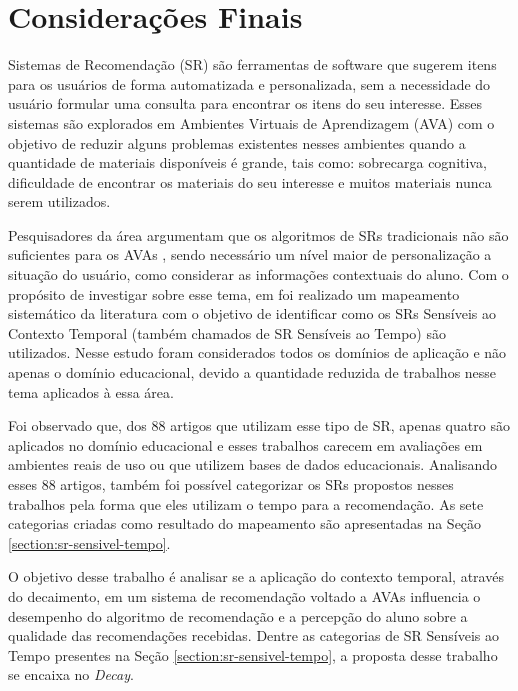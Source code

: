 \chapter{Considerações Finais}\label{chapter:conclusoes}

Sistemas de Recomendação (SR) são ferramentas de software que sugerem itens para os usuários de forma automatizada e personalizada,
sem a necessidade do usuário formular uma consulta para encontrar os itens do seu interesse. Esses sistemas são
explorados em Ambientes Virtuais de Aprendizagem (AVA) com o objetivo de reduzir alguns problemas existentes nesses ambientes
quando a quantidade de materiais disponíveis é grande, tais como: sobrecarga cognitiva, dificuldade de encontrar os materiais
do seu interesse e muitos materiais nunca serem utilizados.

Pesquisadores da área argumentam que os algoritmos de SRs tradicionais não são suficientes para os AVAs \cite{verbert2012context, drachsler2015panorama},
sendo necessário um nível maior de personalização a situação do usuário, como considerar as informações contextuais do aluno.
Com o propósito de investigar sobre esse tema, em  foi realizado um mapeamento sistemático da
literatura com o objetivo de identificar como os SRs Sensíveis ao Contexto Temporal (também chamados de SR Sensíveis ao
Tempo) são utilizados. Nesse estudo foram considerados todos os domínios de aplicação e não apenas o domínio educacional,
devido a quantidade reduzida de trabalhos nesse tema aplicados à essa área.

Foi observado que, dos 88 artigos que utilizam esse tipo de SR, apenas quatro são aplicados no domínio educacional e esses
trabalhos carecem em avaliações em ambientes reais de uso ou que utilizem bases de dados educacionais. Analisando esses
88 artigos, também foi possível categorizar os SRs propostos nesses trabalhos pela forma que eles utilizam o tempo para
a recomendação. As sete categorias criadas como resultado do mapeamento são apresentadas na Seção \ref{section:sr-sensivel-tempo}.

O objetivo desse trabalho é analisar se a aplicação do contexto temporal, através do decaimento, em um sistema de recomendação
voltado a AVAs influencia o desempenho do algoritmo de recomendação e a percepção do aluno sobre a qualidade das recomendações
recebidas. Dentre as categorias de SR Sensíveis ao Tempo presentes na Seção \ref{section:sr-sensivel-tempo}, a proposta
desse trabalho se encaixa no \textit{Decay}.

